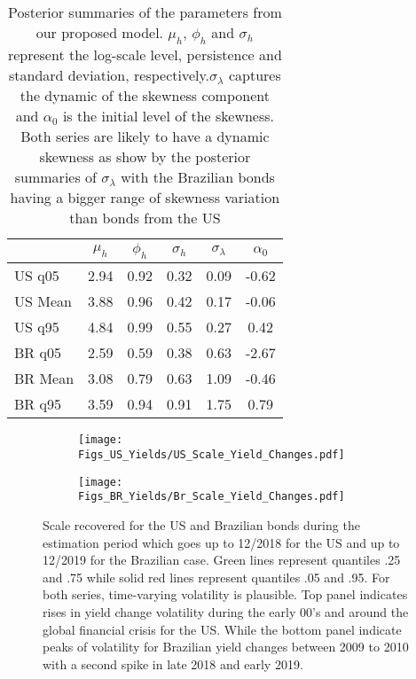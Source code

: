 \documentclass{article}
\begin{document}
\begin{table}[ht]
\centering
\begin{tabular}{lccccc}
  \hline
 & $\mu_h$ & $\phi_h$ & $\sigma_h$ & $\sigma_{\lambda}$ & $\alpha_{0}$ \\ 
   \hline
US q05 & 2.94 & 0.92 & 0.32 & 0.09 & -0.62 \\ 
US Mean  & 3.88 & 0.96 & 0.42 & 0.17 & -0.06 \\ 
US q95 & 4.84 & 0.99 & 0.55 & 0.27 & 0.42 \\ 
   \hline
BR q05 & 2.59 & 0.59 & 0.38 & 0.63 & -2.67 \\ 
BR Mean& 3.08 & 0.79 & 0.63 & 1.09 & -0.46 \\ 
BR q95 & 3.59 & 0.94 & 0.91 & 1.75 & 0.79 \\  
   \hline
\end{tabular}
\caption{Posterior summaries of the parameters from our proposed model. $\mu_h$, $\phi_h$ and $\sigma_h$ represent the log-scale level, persistence and standard deviation, respectively.$ \sigma_{\lambda}$ captures the dynamic of the skewness component and $\alpha_{0}$ is the initial level of the skewness. Both series are likely to have a dynamic skewness as show by the posterior summaries of $\sigma_{\lambda}$ with the Brazilian bonds having a bigger range of skewness variation than bonds from the US}
\label{Tab:ParametersProposal}
\end{table}

\begin{figure}[h!]
\centering
\begin{subfigure}[b]{0.95\textwidth}
\texttt{[image: Figs\_US\_Yields/US\_Scale\_Yield\_Changes.pdf]} 
    \label{fig:us_scale} 
\end{subfigure}
\begin{subfigure}[b]{0.95\textwidth}
\texttt{[image: Figs\_BR\_Yields/Br\_Scale\_Yield\_Changes.pdf]} 
   \label{fig:br_scale}
\end{subfigure}
\caption{Scale recovered for the US and Brazilian bonds during the estimation period which goes up to 12/2018 for the US and up to 12/2019 for the Brazilian case. Green lines represent quantiles .25 and .75 while solid red lines represent quantiles .05 and .95. For both series, time-varying volatility is plausible.  Top panel indicates rises in yield change volatility during the early 00's and around the global financial crisis for the US. While the bottom panel indicate peaks of volatility for Brazilian yield changes between 2009 to 2010 with a second spike in late 2018 and early 2019. }
\label{Fig:Yield_Scale}
\end{figure}
\end{document}
